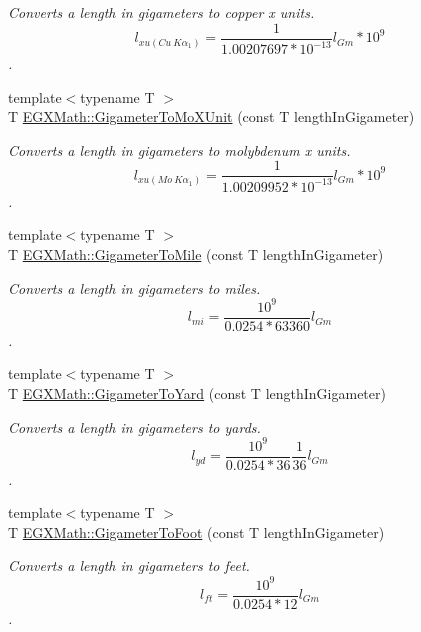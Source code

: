 \begin{DoxyCompactItemize}
\begin{DoxyCompactList}\small\item\em Converts a length in gigameters to copper x units. \[ l_{xu(Cu\ K\alpha_1)}= \frac{1}{1.00207697*10^{-13}} l_{Gm} * 10^{9}\]. \end{DoxyCompactList}\item 
{\footnotesize template$<$typename T $>$ }\\T \mbox{\hyperlink{group___e_g_x_math-_conversions-_length_conversions-_s_i-_gigameter-_non-_s_i_gac30ae06633de77b05d859ffb3cd2a577}{E\+G\+X\+Math\+::\+Gigameter\+To\+Mo\+X\+Unit}} (const T length\+In\+Gigameter)
\begin{DoxyCompactList}\small\item\em Converts a length in gigameters to molybdenum x units. \[ l_{xu(Mo\ K\alpha_1)}=\frac{1}{1.00209952*10^{-13}} l_{Gm} * 10^{9}\]. \end{DoxyCompactList}\item 
{\footnotesize template$<$typename T $>$ }\\T \mbox{\hyperlink{group___e_g_x_math-_conversions-_length_conversions-_s_i-_gigameter-_imperial_gab61b3324bc2080e5118924bffdd0d46d}{E\+G\+X\+Math\+::\+Gigameter\+To\+Mile}} (const T length\+In\+Gigameter)
\begin{DoxyCompactList}\small\item\em Converts a length in gigameters to miles. \[ l_{mi}=\frac{10^{9}}{0.0254 * 63360} l_{Gm} \]. \end{DoxyCompactList}\item 
{\footnotesize template$<$typename T $>$ }\\T \mbox{\hyperlink{group___e_g_x_math-_conversions-_length_conversions-_s_i-_gigameter-_imperial_gadc687ba83985120ec09d825adace01d6}{E\+G\+X\+Math\+::\+Gigameter\+To\+Yard}} (const T length\+In\+Gigameter)
\begin{DoxyCompactList}\small\item\em Converts a length in gigameters to yards. \[ l_{yd}= \frac{10^{9}}{0.0254 * 36} \frac{1}{36} l_{Gm} \]. \end{DoxyCompactList}\item 
{\footnotesize template$<$typename T $>$ }\\T \mbox{\hyperlink{group___e_g_x_math-_conversions-_length_conversions-_s_i-_gigameter-_imperial_gaeabf3c29bcb3076a8b41986debbf046b}{E\+G\+X\+Math\+::\+Gigameter\+To\+Foot}} (const T length\+In\+Gigameter)
\begin{DoxyCompactList}\small\item\em Converts a length in gigameters to feet. \[ l_{ft}= \frac{10^{9}}{0.0254 * 12} l_{Gm} \]. \end{DoxyCompactList}\item 

\end{DoxyCompactItemize}
